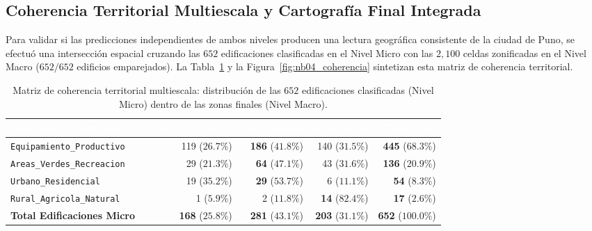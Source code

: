 \documentclass[11pt,a4paper]{article}
\begin{document}
\subsection{Coherencia Territorial Multiescala y Cartografía Final Integrada}

Para validar si las predicciones independientes de ambos niveles producen una lectura geográfica consistente de la ciudad de Puno, se efectuó una intersección espacial cruzando las $652$ edificaciones clasificadas en el Nivel Micro con las $2{,}100$ celdas zonificadas en el Nivel Macro ($652/652$ edificios emparejados). La Tabla~\ref{tab:coherencia_multiescala} y la Figura~\ref{fig:nb04_coherencia} sintetizan esta matriz de coherencia territorial.

\begin{table}[H]
    \centering
    \caption{Matriz de coherencia territorial multiescala: distribución de las $652$ edificaciones clasificadas (Nivel Micro) dentro de las zonas finales (Nivel Macro).}
    \label{tab:coherencia_multiescala}
    \setlength{\tabcolsep}{6pt}
    \small
    \begin{adjustbox}{max width=\textwidth}
    \begin{tabular}{lrrrr}
        \toprule
        \rowcolor{verdeHeader}
        \textcolor{white}{\textbf{Zona Macro (\texttt{zona\_final})}} & \textcolor{white}{\textbf{Comercial / Serv.}} & \textcolor{white}{\textbf{Institucional}} & \textcolor{white}{\textbf{Residencial}} & \textcolor{white}{\textbf{Total Edif.}} \\
        \midrule
        \texttt{Equipamiento\_Productivo} & 119 ($26.7\%$) & \textbf{186} ($41.8\%$) & 140 ($31.5\%$) & \textbf{445} ($68.3\%$) \\
        \rowcolor{verdeSuave!50}
        \texttt{Areas\_Verdes\_Recreacion} & 29 ($21.3\%$) & \textbf{64} ($47.1\%$) & 43 ($31.6\%$) & \textbf{136} ($20.9\%$) \\
        \texttt{Urbano\_Residencial} & 19 ($35.2\%$) & \textbf{29} ($53.7\%$) & 6 ($11.1\%$) & \textbf{54} ($8.3\%$) \\
        \rowcolor{verdeSuave!50}
        \texttt{Rural\_Agricola\_Natural} & 1 ($5.9\%$) & 2 ($11.8\%$) & \textbf{14} ($82.4\%$) & \textbf{17} ($2.6\%$) \\
        \midrule
        \rowcolor{verdeSuave}
        \textbf{Total Edificaciones Micro} & \textbf{168} ($25.8\%$) & \textbf{281} ($43.1\%$) & \textbf{203} ($31.1\%$) & \textbf{652} ($100.0\%$) \\
        \bottomrule
    \end{tabular}
    \end{adjustbox}
\end{table}
\end{document}
